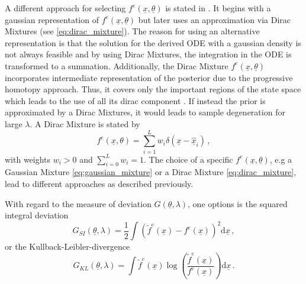 \documentclass[a4paper]{IEEEtran}
\begin{document}
A different approach for selecting $f^e(\underline{x}, \underline{\theta})$ is stated in \cite{hanebeck2012a}. It begins with a gaussian representation of $f^e(\underline{x}, \underline{\theta})$ but later uses an approximation via Dirac Mixtures (see \eqref{eq:dirac_mixture}).
The reason for using an alternative representation is that the solution for the derived ODE with a gaussian density is not always feasible and by using Dirac Mixtures, the integration in the ODE is transformed to a summation. Additionally, the Dirac Mixture $f^e(\underline{x}, \underline{\theta})$ incorporates intermediate representation of the posterior due to the progressive homotopy approach. 
Thus, it covers only the important regions of the state space which leads to the use of all its dirac component \cite{hanebeck2012a}. If instead the prior is approximated by a Dirac Mixtures, it would leads to sample degeneration for large $\lambda$.
A Dirac Mixture is stated by
\begin{equation}
    f^{e}(\underline{x}, \theta) = \sum^{L}_{i=1} w_{i} \delta(\underline{x}-\hat{\underline{x}}_{i}) \,,
    \label{eq:dirac_mixture}
\end{equation}
with weights $w_{i} > 0$ and $\sum^{L}_{i=0} w_{i} = 1$. The choice of a specific $f^e(\underline{x}, \underline{\theta})$, e.g a Gaussian Mixture \eqref{eq:gaussian_mixture} or a Dirac Mixture \eqref{eq:dirac_mixture}, lead to different approaches as described previously.

With regard to the measure of deviation $G(\underline{\theta},\lambda)$, one options is the squared integral deviation
\begin{equation}
    G_{SI}(\underline{\theta}, \lambda) = \frac{1}{2} \int (\tilde{f}^e(\underline{x})-f^{e}(\underline{x}))^2 \mathrm{d}\underline{x}\,,
    \label{eq:squared_integral_dev}
\end{equation}
or the Kullback-Leibler-divergence
\begin{equation}
    G_{KL}(\underline{\theta}, \lambda) = \int \tilde{f}^e(\underline{x}) \log\left(\frac{\tilde{f}^e(\underline{x})}{f^{e}(\underline{x})} \right) \mathrm{d}\underline{x} \,.
    \label{eq:kb_div}
\end{equation}
\end{document}
